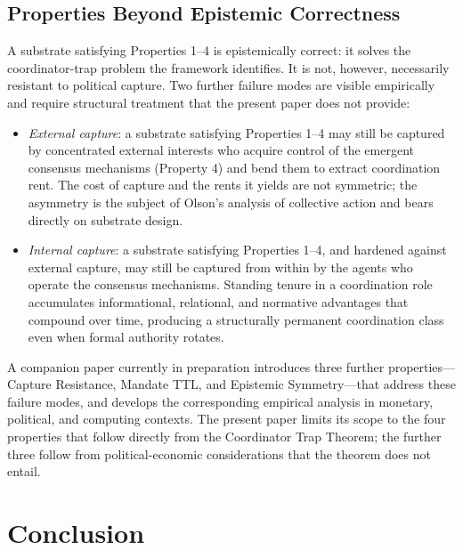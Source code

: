 \documentclass[11pt]{article}
\theoremstyle{definition}
\theoremstyle{plain}
\theoremstyle{plain}
\begin{document}
\subsection{Properties Beyond Epistemic Correctness}

A substrate satisfying Properties 1--4 is epistemically correct: it solves
the coordinator-trap problem the framework identifies. It is not, however,
necessarily resistant to political capture. Two further failure modes are
visible empirically and require structural treatment that the present paper
does not provide:
\begin{itemize}
\item \emph{External capture}: a substrate satisfying Properties 1--4 may
  still be captured by concentrated external interests who acquire control of
  the emergent consensus mechanisms (Property 4) and bend them to extract
  coordination rent. The cost of capture and the rents it yields are not
  symmetric; the asymmetry is the subject of Olson's analysis of collective
  action and bears directly on substrate design.
\item \emph{Internal capture}: a substrate satisfying Properties 1--4, and
  hardened against external capture, may still be captured from within by the
  agents who operate the consensus mechanisms. Standing tenure in a
  coordination role accumulates informational, relational, and normative
  advantages that compound over time, producing a structurally permanent
  coordination class even when formal authority rotates.
\end{itemize}
A companion paper currently in preparation introduces three further
properties---Capture Resistance, Mandate TTL, and Epistemic Symmetry---that
address these failure modes, and develops the corresponding empirical
analysis in monetary, political, and computing contexts. The present paper
limits its scope to the four properties that follow directly from the
Coordinator Trap Theorem; the further three follow from political-economic
considerations that the theorem does not entail.

\section{Conclusion}
\end{document}
